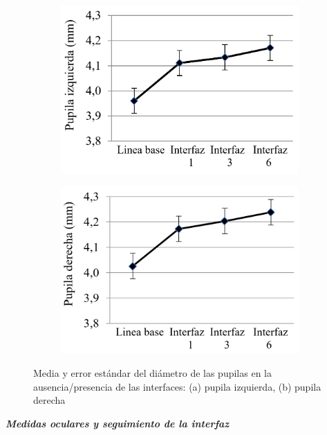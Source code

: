 \begin{figure}[h]
  \centering
  \begin{subfigure}[b]{0.45\textwidth}
    \includegraphics[width=\textwidth]{figures/3.11a.png}
    \caption{}
    \label{fig:3.11a}
  \end{subfigure}
  \hfill
  \begin{subfigure}[b]{0.45\textwidth}
    \includegraphics[width=\textwidth]{figures/3.11b.png}
    \caption{}
    \label{fig:3.11b}
  \end{subfigure}
  \caption{Media y error estándar del diámetro de las pupilas en la ausencia/presencia de las interfaces: (a) pupila izquierda, (b) pupila derecha}
  \label{fig:3.11}
\end{figure}

\textbf{\emph{Medidas oculares y seguimiento de la interfaz}}


